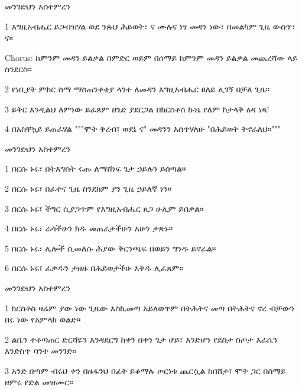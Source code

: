 \documentclass[12pt]{article}
\begin{document}
\begin{hymn}{4}{መንገድህን አስተምረን}
\begin{stanza}
1 እግዚአብሔር ይጋብዝሃል
ወደ ንጹህ ሕይወት፣ ና
ሙሉና ነፃ መዳን ነው፣
በመልካም ጊዜ ውስጥ፣ ና።
\end{stanza}
\begin{chorus}
Chorus: ከምንም መዳን ይልቃል
በምድር ወይም በሰማይ
ከምንም መዳን ይልቃል
መጨረሻው ላይ ስንደርስ።
\end{chorus}
\begin{stanza}
2 የነቢያት ምክር ስማ
ማስጠንቀቂያ ላንተ
ለመዳን እግዚአብሔር ፀለይ
ሊገኝ በቻለ ጊዜ።
\end{stanza}
\begin{stanza}
3 ይቅር እንዲልህ ለምነው
ይፈጸም ዘንድ ያደርጋል
በክርስቶስ ኩነኔ የለም
ከታላቅ ዕዳ ነጻ!
\end{stanza}
\begin{stanza}
4 በአስቸኳይ ይጠራሃል
"""ሞት ቅረብ፣ ወደኔ ና"
መዳንን እሰጥሃለሁ
"በሕይወት ትኖራለህ።"""
\end{stanza}
\end{hymn}

\begin{hymn}{4}{መንገድህን አስተምረን}
\begin{stanza}
1 በርሱ ኑሩ፣ በትእግስት ሩጡ
ለማሸነፍ ጌታ ኃይሉን ይሰጣል።
\end{stanza}
\begin{stanza}
2 በርሱ ኑሩ፣ በፈተና ጊዜ
ስንደክም ያን ጊዜ ኃይለኛ ነን።
\end{stanza}
\begin{stanza}
3 በርሱ ኑሩ፣ ችግር ሲያጋጥም
የእግዚአብሔር ጸጋ ሁሌም ይበቃል።
\end{stanza}
\begin{stanza}
4 በርሱ ኑሩ፣ ራሳችሁን ክዱ
መጠራታችሁን አሁን ታጽኑ።
\end{stanza}
\begin{stanza}
5 በርሱ ኑሩ፣ ሌሎች ሲመለሱ
ሕያው ቅርንጫፍ በወይን ግንዱ ይኖራል።
\end{stanza}
\begin{stanza}
6 በርሱ ኑሩ፣ ፈቃዱን ታዘዙ
በሕይወታችሁ እቅዱ ሊፈጸም።
\end{stanza}
\end{hymn}

\begin{hymn}{4}{መንገድህን አስተምረን}
\begin{stanza}
1 ክርስቶስ ዛሬም ያው ነው
ጊዜው እስኪመጣ
አይለወጥም
በትሕትና መጣ
በትሕትና ኖረ
ብቻውን በሩ ነው
የአምላክ ወልድ።
\end{stanza}
\begin{stanza}
2 ልቤን ተቆጣጠር
ድርሻዬን እንዳደርግ
ከቀን በቀን
ጌታ ሆይ፣ እንድሆን
የደስታ ስጦታ
እራሴን እንድስጥ
ባንተ መንገድ።
\end{stanza}
\begin{stanza}
3 አንድ በጣም ብሩህ ቀን
በዙፋንህ በፊት
ይቆማሉ
ጦርነቱ ጨርሷል
ከበሸታ፣ ሞት ጋር
በሰማይ ዘምሩ
የድል መዝሙር።
\end{stanza}
\end{hymn}
\end{document}
